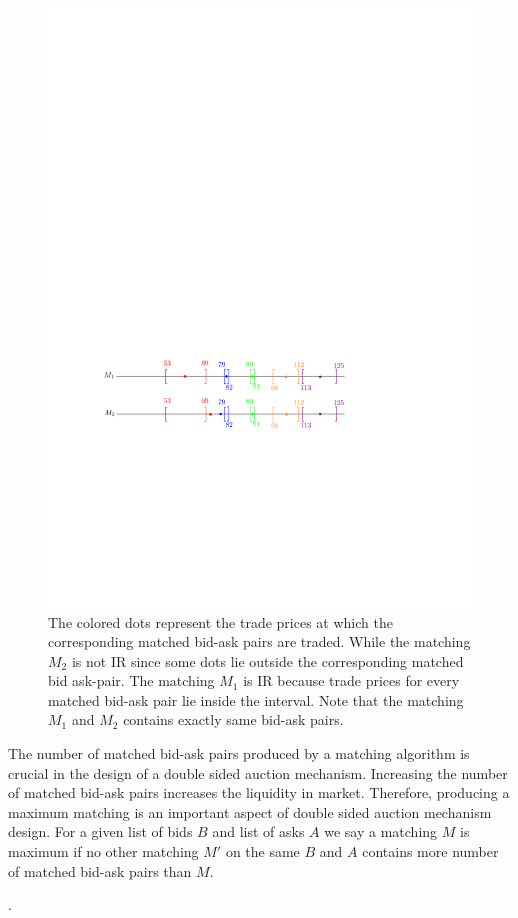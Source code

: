 \documentclass[a4paper,UKenglish,cleveref, autoref]{lipics-v2019}
\begin{document}
\begin{figure}[h!]
\centering
\includegraphics[width=.8\textwidth]{brack_IR.pdf}
\caption{ The colored dots represent the trade prices at which the corresponding matched bid-ask pairs are traded. While the matching $M_2$ is not IR since some dots lie outside the corresponding matched bid ask-pair. The matching $M_1$ is IR because trade prices for every matched bid-ask pair  lie inside the interval. Note that the matching $M_1$ and $M_2$ contains exactly same bid-ask pairs.}
\label{fig:IR}
\end{figure}

The number of matched bid-ask pairs produced by a matching algorithm is crucial in the design of a double sided auction mechanism. Increasing the number of matched bid-ask pairs increases the liquidity in market. Therefore, producing a maximum matching is an important aspect of double sided auction mechanism design. For a given list of bids $B$ and list of asks $A$ we say a matching $M$ is  maximum if no other matching $M'$ on the same $B$ and $A$ contains more number of matched bid-ask pairs than $M$. 

\begin{definition}
.
\end{definition}
\end{document}
